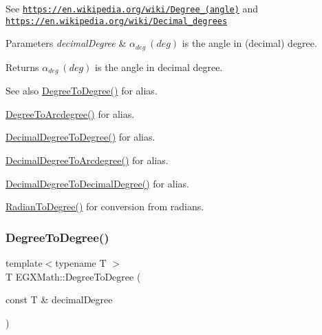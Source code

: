 See \href{https://en.wikipedia.org/wiki/Degree_(angle)}{\tt https\+://en.\+wikipedia.\+org/wiki/\+Degree\+\_\+(angle)} and \href{https://en.wikipedia.org/wiki/Decimal_degrees}{\tt https\+://en.\+wikipedia.\+org/wiki/\+Decimal\+\_\+degrees} 
\begin{DoxyParams}{Parameters}
{\em decimal\+Degree} & $\alpha_{deg}\ (deg)$ is the angle in (decimal) degree. \\
\hline
\end{DoxyParams}
\begin{DoxyReturn}{Returns}
$\alpha_{deg}\ (deg)$ is the angle in decimal degree. 
\end{DoxyReturn}
\begin{DoxySeeAlso}{See also}
\mbox{\hyperlink{group___e_g_x_math-_angle_conversions-_degree_gaca157e7d3e99a46a11a04b92680d2574}{Degree\+To\+Degree()}} for alias. 

\mbox{\hyperlink{group___e_g_x_math-_angle_conversions-_degree_gac1b5f3b68f66c77a6df4ceef842c9b19}{Degree\+To\+Arcdegree()}} for alias. 

\mbox{\hyperlink{group___e_g_x_math-_angle_conversions-_decimal_degree_ga0aa7f2f5dbb00cf4ab303421c6e33ccf}{Decimal\+Degree\+To\+Degree()}} for alias. 

\mbox{\hyperlink{group___e_g_x_math-_angle_conversions-_decimal_degree_gacdd463fcabffeb598ebda65b012ce743}{Decimal\+Degree\+To\+Arcdegree()}} for alias. 

\mbox{\hyperlink{group___e_g_x_math-_angle_conversions-_decimal_degree_gafccf9cd779903872887978ab9d79661f}{Decimal\+Degree\+To\+Decimal\+Degree()}} for alias. 

\mbox{\hyperlink{group___e_g_x_math-_angle_conversions-_radian_ga25bbce6cdc1c3621f2a158d320e3bc45}{Radian\+To\+Degree()}} for conversion from radians. 
\end{DoxySeeAlso}
\mbox{\label{group___e_g_x_math-_angle_conversions-_degree_gaca157e7d3e99a46a11a04b92680d2574}} 
\subsubsection{\texorpdfstring{Degree\+To\+Degree()}{DegreeToDegree()}}
{\footnotesize\ttfamily template$<$typename T $>$ \\
T E\+G\+X\+Math\+::\+Degree\+To\+Degree (\begin{DoxyParamCaption}\item[{const T \&}]{decimal\+Degree }\end{DoxyParamCaption})}



